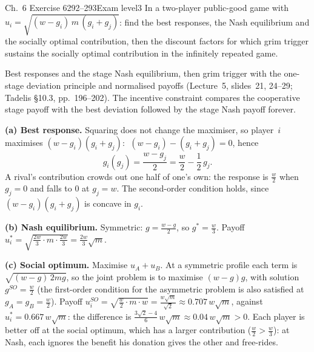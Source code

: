 \begin{exsol}{\MG{} Ch.~6 Exercise 6}{292--293}{Exam level}{3}
\asked In a two-player public-good game with $u_i = \sqrt{(w - g_i)\,m\,(g_i + g_j)}$: find the best
responses, the Nash equilibrium and the socially optimal contribution, then the discount factors for which
grim trigger sustains the socially optimal contribution in the infinitely repeated game.

\method Best responses and the stage Nash equilibrium, then grim trigger with the one-stage deviation
principle and normalised payoffs (Lecture~5, slides~21, 24--29; Tadelis \S10.3, pp.~196--202). The
incentive constraint compares the cooperative stage payoff with the best deviation followed by the stage
Nash payoff forever.

\solution
\textbf{(a) Best response.} Squaring does not change the maximiser, so player~$i$ maximises
$(w - g_i)(g_i + g_j)$: $\;(w - g_i) - (g_i + g_j) = 0$, hence
\[
  g_i(g_j) = \frac{w - g_j}{2} = \frac w2 - \frac12\,g_j .
\]
A rival's contribution crowds out one half of one's own: the response is $\frac w2$ when $g_j = 0$ and falls
to $0$ at $g_j = w$. The second-order condition holds, since $(w-g_i)(g_i+g_j)$ is concave in $g_i$.

\textbf{(b) Nash equilibrium.} Symmetric: $g = \frac{w - g}{2}$, so $g^* = \frac w3$. Payoff
$u_i^* = \sqrt{\tfrac{2w}{3}\cdot m\cdot\tfrac{2w}{3}} = \frac{2w}{3}\sqrt m$.

\textbf{(c) Social optimum.} Maximise $u_A + u_B$. At a symmetric profile each term is
$\sqrt{(w - g)\,2mg}$, so the joint problem is to maximise $(w - g)g$, with
solution $g^{SO} = \frac w2$ (the first-order condition for the asymmetric problem is also satisfied at
$g_A = g_B = \frac w2$). Payoff $u_i^{SO} = \sqrt{\tfrac w2\cdot m\cdot w} = \frac{w\sqrt m}{\sqrt2} \approx 0.707\,w\sqrt m$,
against $u_i^* = 0.667\,w\sqrt m$: the difference is $\frac{3\sqrt2 - 4}{6}\,w\sqrt m \approx 0.04\,w\sqrt m > 0$.
Each player is better off at the social optimum, which has a larger contribution ($\frac w2 > \frac w3$):
at Nash, each ignores the benefit his donation gives the other and free-rides.


\end{exsol}
